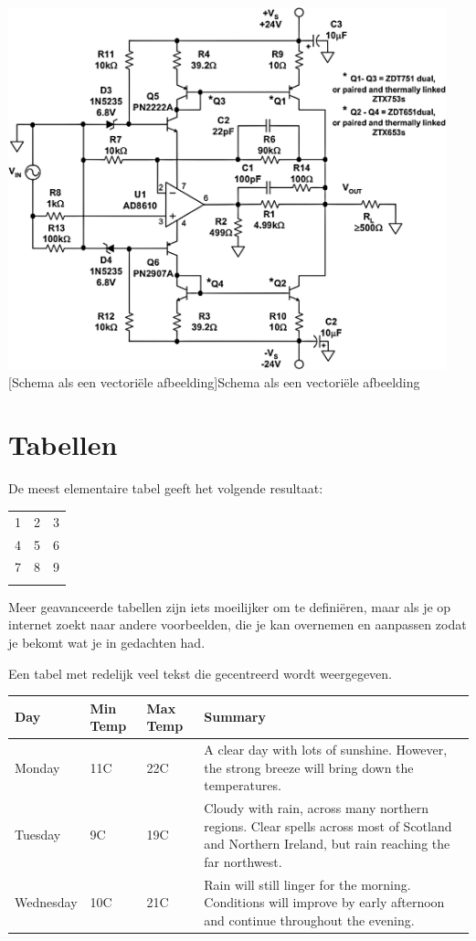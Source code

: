 \begin{center}
\includegraphics[width=0.95\textwidth]{figures/chap2/schema2.pdf}
[Schema als een vectori\"ele afbeelding]{Schema als een vectori\"ele afbeelding\label{fig_voorbeeld3}}
\end{center}

\section{Tabellen}

De meest elementaire tabel geeft het volgende resultaat:

\begin{tabular}{ l c r }
  1 & 2 & 3 \\
  4 & 5 & 6 \\
  7 & 8 & 9 \\
\label{eenvoudige tabel}
\end{tabular}

Meer geavanceerde tabellen zijn iets moeilijker om te defini\"eren, maar als je op internet zoekt naar andere voorbeelden, die je kan overnemen en aanpassen zodat je bekomt wat je in gedachten had.

Een tabel met redelijk veel tekst die gecentreerd wordt weergegeven.

\begin{center}
    \begin{tabular}{ | l | l | l | p{5cm} |}
    \hline
     Day         & Min Temp & Max Temp & Summary \\ \hline \hline
     Monday      & 11C      & 22C      & A clear day with lots of sunshine.  
     However, the strong breeze will bring down the temperatures. \\ \hline
     Tuesday     & 9C       & 19C      & Cloudy with rain, across many northern regions. Clear spells across most of Scotland and Northern Ireland, but rain reaching the far northwest. \\ \hline
     Wednesday   & 10C      & 21C      & Rain will still linger for the morning. Conditions will improve by early afternoon and continue throughout the evening. \\
    \hline
    \end{tabular}
\label{tb:Xname}
\end{center}

